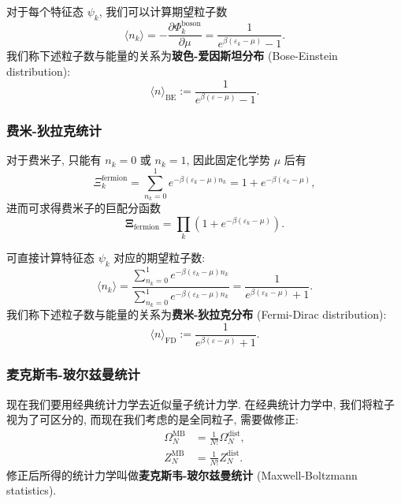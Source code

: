 对于每个特征态 $ \psi_k $, 我们可以计算期望粒子数
\[ \langle n_k\rangle=-\frac{\partial\Phi^{\mathrm{boson}}_k}{\partial\mu}=\frac{1}{e^{\beta(\varepsilon_k-\mu)}-1}. \]
我们称下述粒子数与能量的关系为{\bf 玻色-爱因斯坦分布} (Bose-Einstein distribution):
\[ \langle n\rangle_{\mathrm{BE}}:=\frac{1}{e^{\beta(\varepsilon-\mu)}-1}. \]

\subsubsection*{费米-狄拉克统计}
对于费米子, 只能有 $ n_k=0 $ 或 $ n_k=1 $, 因此固定化学势 $ \mu $ 后有
\[ \Xi^{\mathrm{fermion}}_k=\sum_{n_k=0}^{1}e^{-\beta(\varepsilon_k-\mu)n_k}=1+e^{-\beta(\varepsilon_k-\mu)}, \]
进而可求得费米子的巨配分函数
\[ \bm\Xi_{\mathrm{fermion}}=\prod_k\left( 1+e^{-\beta(\varepsilon_k-\mu)} \right). \]

可直接计算特征态 $ \psi_k $ 对应的期望粒子数:
\[ \langle n_k\rangle=\frac{\sum_{n_k=0}^{1}e^{-\beta(\varepsilon_k-\mu)n_k}}{\sum_{n_k=0}^{1}e^{-\beta(\varepsilon_k-\mu)n_k}}=\frac{1}{e^{\beta(\varepsilon_k-\mu)}+1}. \]
我们称下述粒子数与能量的关系为{\bf 费米-狄拉克分布} (Fermi-Dirac distribution):
\[ \langle n\rangle_{\mathrm{FD}}:=\frac{1}{e^{\beta(\varepsilon-\mu)}+1}. \]

\subsubsection*{麦克斯韦-玻尔兹曼统计}
现在我们要用经典统计力学去近似量子统计力学. 在经典统计力学中, 我们将粒子视为了可区分的, 而现在我们考虑的是全同粒子, 需要做修正:
\begin{align*}
    \Omega^{\mathrm{MB}}_N &= \frac{1}{N!}\Omega^{\mathrm{dist}}_N,\\
    Z^{\mathrm{MB}}_N &= \frac{1}{N!}Z^{\mathrm{dist}}_N.
\end{align*}
修正后所得的统计力学叫做{\bf 麦克斯韦-玻尔兹曼统计} (Maxwell-Boltzmann statistics).

